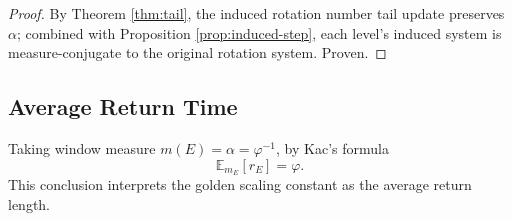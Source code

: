 \begin{proof}
By Theorem \ref{thm:tail}, the induced rotation number tail update preserves $\alpha$; combined with Proposition \ref{prop:induced-step}, each level's induced system is measure-conjugate to the original rotation system. Proven.
\end{proof}

\subsection{Average Return Time}

Taking window measure $m(E)=\alpha=\varphi^{-1}$, by Kac's formula
\[
\mathbb{E}_{m_E}[r_E]=\varphi.
\]
This conclusion interprets the golden scaling constant as the average return length.

